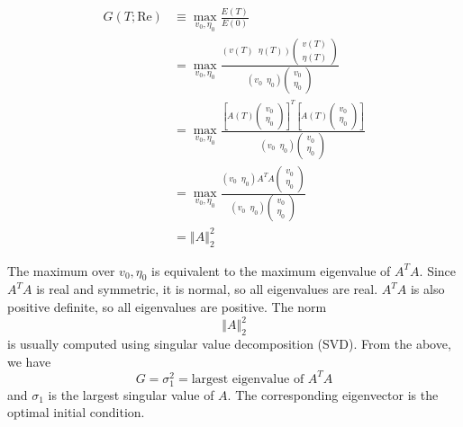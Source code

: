 \documentclass{jknotes}
\newcommand{\ReN}{\text{Re}}
\begin{document}
\begin{align}
	G(T; \ReN) &\equiv \max_{v_0, \eta_0} \frac{E(T)}{E(0)} \\
			   &= \max_{v_0, \eta_0} \frac{(v(T) \,\,\,
				   \eta(T))\begin{pmatrix}v(T) \\ \eta(T) \end{pmatrix}}{(v_0
			   \,\,\, \eta_0) \begin{pmatrix} v_0 \\ \eta_0 \end{pmatrix}} \\
			   &= \max_{v_0, \eta_0} \frac{ \left[ A(T) \begin{pmatrix} v_0 \\
					   \eta_0 \end{pmatrix} \right]^T \left[ A(T)
					   \begin{pmatrix} v_0 \\ \eta_0 \end{pmatrix} \right]
					   }{(v_0 \,\,\, \eta_0)\begin{pmatrix} v_0 \\ \eta_0
\end{pmatrix}} \\
&= \max_{v_0, \eta_0} \frac{(v_0 \,\,\, \eta_0)A^T A \begin{pmatrix} v_0 \\
		\eta_0 \end{pmatrix}}{(v_0 \,\,\, \eta_0)\begin{pmatrix} v_0 \\ \eta_0
\end{pmatrix}}\\
&= \left\Vert A \right\Vert_2^2
\end{align}

The maximum over $v_0, \eta_0$ is equivalent to the maximum eigenvalue of $A^T
A$. Since $A^T A$ is real and symmetric, it is normal, so all eigenvalues are
real. $A^TA$ is also positive definite, so all eigenvalues are positive. The
norm
\begin{equation}
	\left\Vert A \right\Vert_2^2
\end{equation}
is usually computed using singular value decomposition (SVD). From the above,
we have
\begin{equation}
	G = \sigma_1^2 = \text{largest eigenvalue of}\,\, A^T A
\end{equation}
and $\sigma_1$ is the largest singular value of $A$. The corresponding
eigenvector is the optimal initial condition.
\end{document}
